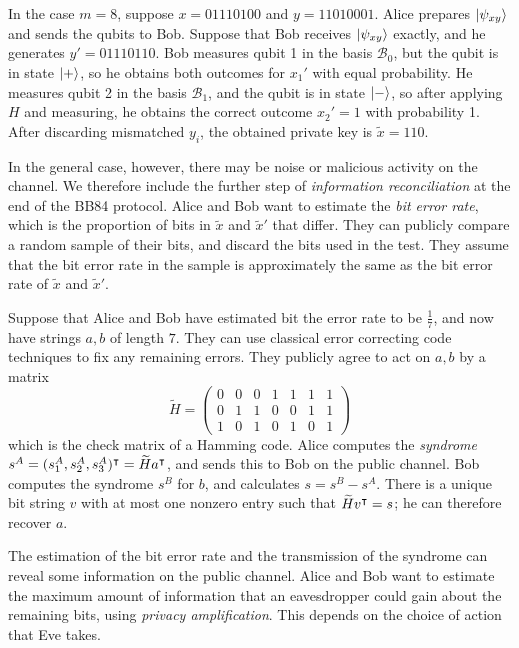 In the case \( m = 8 \), suppose \( x = 01110100 \) and \( y = 11010001 \).
Alice prepares \( \ket{\psi_{xy}} \) and sends the qubits to Bob.
Suppose that Bob receives \( \ket{\psi_{xy}} \) exactly, and he generates \( y' = 01110110 \).
Bob measures qubit 1 in the basis \( \mathcal B_0 \), but the qubit is in state \( \ket{+} \), so he obtains both outcomes for \( x_1' \) with equal probability.
He measures qubit 2 in the basis \( \mathcal B_1 \), and the qubit is in state \( \ket{-} \), so after applying \( H \) and measuring, he obtains the correct outcome \( x_2' = 1 \) with probability 1.
After discarding mismatched \( y_i \), the obtained private key is \( \widetilde x = 110 \).

In the general case, however, there may be noise or malicious activity on the channel.
We therefore include the further step of \emph{information reconciliation} at the end of the BB84 protocol.
Alice and Bob want to estimate the \emph{bit error rate}, which is the proportion of bits in \( \widetilde x \) and \( \widetilde x' \) that differ.
They can publicly compare a random sample of their bits, and discard the bits used in the test.
They assume that the bit error rate in the sample is approximately the same as the bit error rate of \( \widetilde x \) and \( \widetilde x' \).

Suppose that Alice and Bob have estimated bit the error rate to be \( \frac{1}{7} \), and now have strings \( a, b \) of length \( 7 \).
They can use classical error correcting code techniques to fix any remaining errors.
They publicly agree to act on \( a, b \) by a matrix
\[ \widetilde H = \begin{pmatrix}
    0 & 0 & 0 & 1 & 1 & 1 & 1 \\
    0 & 1 & 1 & 0 & 0 & 1 & 1 \\
    1 & 0 & 1 & 0 & 1 & 0 & 1
\end{pmatrix} \]
which is the check matrix of a Hamming code.
Alice computes the \emph{syndrome} \( s^A = (s_1^A, s_2^A, s_3^A)^\intercal = \widetilde H a^\intercal \), and sends this to Bob on the public channel.
Bob computes the syndrome \( s^B \) for \( b \), and calculates \( s = s^B - s^A \).
There is a unique bit string \( v \) with at most one nonzero entry such that \( \widetilde H v^\intercal = s \); he can therefore recover \( a \).

The estimation of the bit error rate and the transmission of the syndrome can reveal some information on the public channel.
Alice and Bob want to estimate the maximum amount of information that an eavesdropper could gain about the remaining bits, using \emph{privacy amplification}.
This depends on the choice of action that Eve takes.


